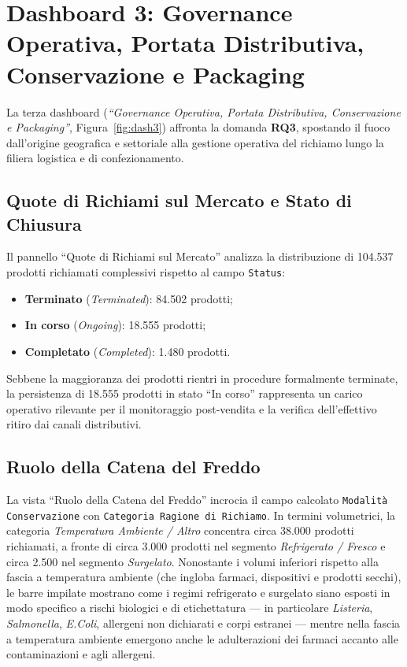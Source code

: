 \section{Dashboard 3: Governance Operativa, Portata Distributiva, Conservazione e Packaging}
\label{subsec:dash3}

La terza dashboard (\textit{``Governance Operativa, Portata Distributiva, Conservazione e Packaging''}, Figura~\ref{fig:dash3}) affronta la domanda \textbf{RQ3}, spostando il fuoco dall'origine geografica e settoriale alla gestione operativa del richiamo lungo la filiera logistica e di confezionamento.


\subsection{Quote di Richiami sul Mercato e Stato di Chiusura}
Il pannello ``Quote di Richiami sul Mercato'' analizza la distribuzione di 104.537 prodotti richiamati complessivi rispetto al campo \texttt{Status}:
\begin{itemize}
    \item \textbf{Terminato} (\textit{Terminated}): 84.502 prodotti;
    \item \textbf{In corso} (\textit{Ongoing}): 18.555 prodotti;
    \item \textbf{Completato} (\textit{Completed}): 1.480 prodotti.
\end{itemize}
Sebbene la maggioranza dei prodotti rientri in procedure formalmente terminate, la persistenza di 18.555 prodotti in stato ``In corso'' rappresenta un carico operativo rilevante per il monitoraggio post-vendita e la verifica dell'effettivo ritiro dai canali distributivi.

\subsection{Ruolo della Catena del Freddo}
La vista ``Ruolo della Catena del Freddo'' incrocia il campo calcolato \texttt{Modalità Conservazione} con \texttt{Categoria Ragione di Richiamo}. In termini volumetrici, la categoria \textit{Temperatura Ambiente / Altro} concentra circa 38.000 prodotti richiamati, a fronte di circa 3.000 prodotti nel segmento \textit{Refrigerato / Fresco} e circa 2.500 nel segmento \textit{Surgelato}. Nonostante i volumi inferiori rispetto alla fascia a temperatura ambiente (che ingloba farmaci, dispositivi e prodotti secchi), le barre impilate mostrano come i regimi refrigerato e surgelato siano esposti in modo specifico a rischi biologici e di etichettatura --- in particolare \textit{Listeria}, \textit{Salmonella}, \textit{E.Coli}, allergeni non dichiarati e corpi estranei --- mentre nella fascia a temperatura ambiente emergono anche le adulterazioni dei farmaci accanto alle contaminazioni e agli allergeni. 

